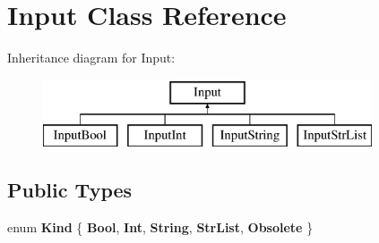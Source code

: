 \hypertarget{class_input}{}\section{Input Class Reference}
\label{class_input}
Inheritance diagram for Input\+:\begin{figure}[H]
\begin{center}
\leavevmode
\includegraphics[height=2.000000cm]{class_input}
\end{center}
\end{figure}
\subsection*{Public Types}
\begin{DoxyCompactItemize}
\item 
\mbox{\label{class_input_a4138334795f6330759839617744e20a9}} 
enum {\bfseries Kind} \{ \newline
{\bfseries Bool}, 
{\bfseries Int}, 
{\bfseries String}, 
{\bfseries Str\+List}, 
\newline
{\bfseries Obsolete}
 \}
\end{DoxyCompactItemize}
